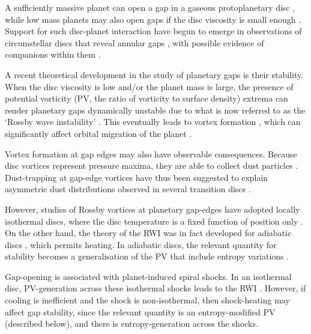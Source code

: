 \documentclass[useAMS,usenatbib]{mn2e}
\begin{document}
A sufficiently massive planet can open a gap in a 
gaseous protoplanetary disc \citep{pap_lin84,bryden99,crida06,fung14}, 
while low mass planets may also open gaps if the disc viscosity is
small enough \citep{li09,dong11,duffell13}. Support for such disc-planet
interaction have begun to emerge in observations of circumstellar
discs that reveal annular gaps
\citep[e.g.][]{quanz13a,debes13,osorio14}, with possible evidence of
companions within them \citep[e.g.][]{quanz13b,reggiani14}. 


A recent theoretical development in the study of planetary gaps is
their stability. When the disc viscosity is low and/or the planet mass
is large, the presence of potential vorticity (PV, the ratio of
vorticity to surface density) extrema can render planetary gaps
dynamically unstable due to what is now referred to as the `Rossby
wave instability' \citep[RWI,][]{lovelace99,li00}. This 
eventually leads to vortex formation 
\citep{li01,koller03,li05,valborro07}, which can significantly affect
orbital migration of the planet  \citep{ou07,li09,yu10,lin10}. 

Vortex formation at gap edges may also have observable 
consequences. Because disc vortices represent pressure maxima, they are
able to collect dust particles 
\citep{barge95,inaba06,lyra13}. Dust-trapping at gap-edge vortices
have thus been suggested to explain asymmetric dust
distributions observed in several transition discs
\citep[e.g][]{marel13,isella13,perez14}. 

However, studies of Rossby vortices at planetary gap-edges have 
adopted locally isothermal discs, %
where the disc temperature is a fixed function of
position only \citep[e.g.][]{lyra08,lin11a,zhu14,fu14}. 
On the other hand, the theory of the RWI was in fact
developed for adiabatic discs \citep{li00}, which permits
heating. %
In adiabatic discs, the relevant quantity for stability
becomes a generalisation of the PV that include entropy variations
\citep{lovelace99}.   


Gap-opening is associated with planet-induced spiral shocks. In an
isothermal disc, PV-generation across these isothermal shocks leads to
the RWI \citep{koller03,li05,valborro07,lin10}.    
However, if cooling is inefficient and the shock is non-isothermal,
then shock-heating may affect gap stability, since the
relevant quantity is an entropy-modified PV (described below), and
there is entropy-generation across the shocks. 
\end{document}
